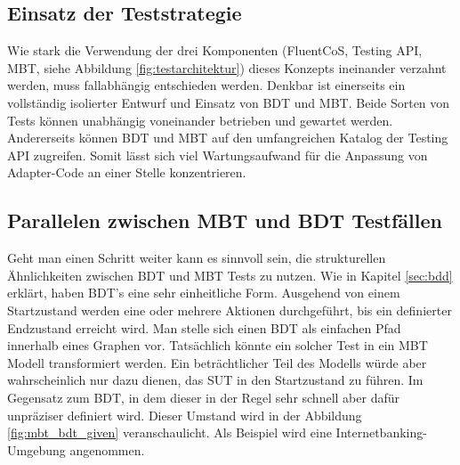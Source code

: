 \subsection{Einsatz der Teststrategie}
Wie stark die Verwendung der drei Komponenten (FluentCoS, Testing API, MBT, siehe Abbildung \ref{fig:testarchitektur}) dieses Konzepts ineinander verzahnt werden, muss fallabhängig entschieden werden. Denkbar ist einerseits ein vollständig isolierter Entwurf und Einsatz von \Gls{BDT} und \Gls{MBT}. Beide Sorten von Tests können unabhängig voneinander betrieben und gewartet werden. Andererseits können \Gls{BDT} und \Gls{MBT} auf den umfangreichen Katalog der Testing API zugreifen. Somit lässt sich viel Wartungsaufwand für die Anpassung von Adapter-Code an einer Stelle konzentrieren.

\subsection{Parallelen zwischen MBT und BDT Testfällen}
\label{sec:mbt_bdt_parallelen}

Geht man einen Schritt weiter kann es sinnvoll sein, die strukturellen Ähnlichkeiten zwischen \Gls{BDT} und \Gls{MBT} Tests zu nutzen. Wie in Kapitel \ref{sec:bdd} erklärt, haben \Gls{BDT}'s eine sehr einheitliche Form. Ausgehend von einem Startzustand werden eine oder mehrere Aktionen durchgeführt, bis ein definierter Endzustand erreicht wird. Man stelle sich einen \Gls{BDT} als einfachen Pfad innerhalb eines Graphen vor. Tatsächlich könnte ein solcher Test in ein \Gls{MBT} Modell transformiert werden. Ein beträchtlicher Teil des Modells würde aber wahrscheinlich nur dazu dienen, das \Gls{SUT} in den Startzustand zu führen. Im Gegensatz zum \Gls{BDT}, in dem dieser in der Regel sehr schnell aber dafür unpräziser definiert wird. Dieser Umstand wird in der Abbildung \ref{fig:mbt_bdt_given} veranschaulicht. Als Beispiel wird eine Internetbanking-Umgebung angenommen.

